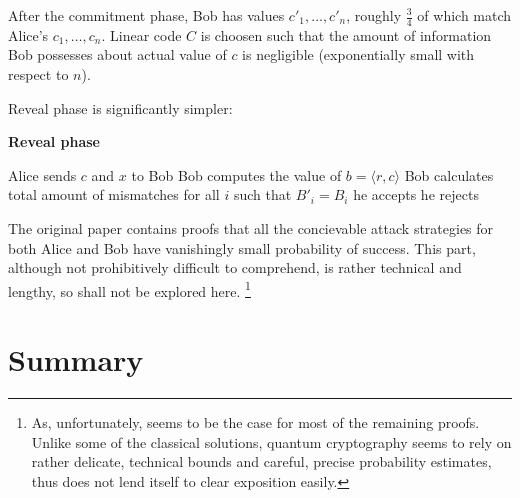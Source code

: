 \documentclass[10pt]{article}
\begin{document}
After the commitment phase, Bob has values \(c'_1,\ldots,c'_n\), roughly \(\frac{3}{4}\) of 
which match Alice's \(c_1,\ldots,c_n\). Linear code \(C\) is choosen such that the amount of
information Bob possesses about actual value of \(c\) is negligible (exponentially small with
respect to \(n\)).

Reveal phase is significantly simpler:

\NoCaptionOfAlgo
\begin{algorithm}[H]
\caption{\textbf{Reveal phase}}
Alice sends \(c\) and \(x\) to Bob \;
Bob computes the value of \(b=\langle r,c\rangle\) \;
Bob calculates total amount of mismatches for all \(i\) such that \(B'_i=B_i\) \;
 {
  he accepts
}{
  he rejects
}
\end{algorithm}

The original paper contains proofs that all the concievable attack strategies for both Alice
and Bob have vanishingly small probability of success. This part, although not prohibitively
difficult to comprehend, is rather technical and lengthy, so shall not be explored here.
\footnote{As, unfortunately, seems to be the case for most of the remaining proofs. Unlike
some of the classical solutions, quantum cryptography seems to rely on rather delicate, technical
bounds and careful, precise probability estimates, thus does not lend itself to clear exposition
easily.}


\section{Summary}

\nocite{*}



\end{document}
